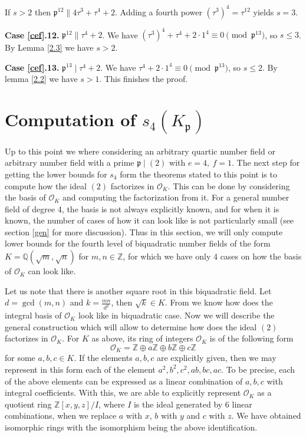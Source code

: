 \documentclass[12pt]{article}
\theoremstyle{remark}
\newcommand{\p}{\mathfrak{p}}
\newcommand{\OO}{\mathcal{O}}
\begin{document}
If $s>2$ then $\mathfrak{p}^{12} \parallel 4\tau^3+\tau^4+2$. Adding a fourth power $(\tau^3)^4 = \tau^{12}$ yields $s=3$. 


\textbf{Case \ref{cef}.12.} $\mathfrak{p}^{12} \parallel \tau^4+2$. We have $(\tau^3)^4+\tau^4+2 \cdot 1^4 \equiv 0 \pmod{\mathfrak{p}^{13}}$, so $s \leq 3$. By Lemma \ref{2.3} we have $s>2$.


\textbf{Case \ref{cef}.13.} $\mathfrak{p}^{13} \mid \tau^4+2$. We have $\tau^4+ 2\cdot 1^4 \equiv 0 \pmod{\mathfrak{p}^{13}}$, so $s \leq 2$. By lemma \ref{2.2} we have $s > 1$. This finishes the proof.









\section{Computation of $s_4(K_{\mathfrak{p}})$} \label{step2}  

Up to this point we where considering an arbitrary quartic number field or arbitrary number field with a prime $\p \mid (2)$ with $e=4, \ f=1$. The next step for getting the lower bounds for $s_4$ form the theorems stated to this point is to compute how the ideal $(2)$ factorizes in $\OO_K$. This can be done by considering the basis of $\OO_K$ and computing the factorization from it. For a general number field of degree 4, the basis is not always explicitly known, and for when it is known, the number of cases of how it can look like is not particularly small (see section \ref{gen} for more discussion). Thus in this section, we will only compute lower bounds for the fourth level of biquadratic number fields of the form  $K = \mathbb{Q}(\sqrt{m},\sqrt{n})$ for $m,n \in \mathbb{Z}$, for which we have only 4 cases on how the basis of $\OO_K$ can look like.

Let us note that there is another square root in this biquadratic field.  Let $d = \gcd(m,n)$ and $k = \frac{mn}{d^2}$, then $\sqrt{k} \in K$. From \cite[Exercise 2.42]{marcus2018} we know how does the integral basis of $\mathcal{O}_K$ look like in biquadratic case. Now we will describe the general construction which will allow to determine how does the ideal $(2)$ factorizes in $\mathcal{O}_K$. For $K$ as above, its ring of integers $\mathcal{O}_K$ is of the following form
$$\mathcal{O}_K = \mathbb{Z} \oplus a\mathbb{Z}\oplus b\mathbb{Z}\oplus c \mathbb{Z} $$
for some $a,b,c \in K$. If the elements $a,b,c$ are explicitly given, then we may represent in this form each of the element $a^2,b^2,c^2,ab,bc,ac$. To be precise, each of the above elements can be expressed as a linear combination of $a,b,c$ with integral coefficients. With this, we are able to explicitly represent $\mathcal{O}_K$ as a quotient ring $\mathbb{Z}[x,y,z]/I$, where $I$ is the ideal generated by 6 linear combinations, when we replace $a$ with $x$, $b$ with $y$ and $c$ with $z$. We have obtained isomorphic rings with the isomorphism being the above identification.
\end{document}
